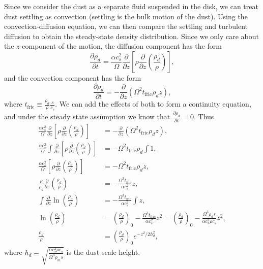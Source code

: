 \documentclass[11pt]{article}
\newenvironment{tight_enumerate}{
    \begin{enumerate}[label=(\alph*)]
    \setlength{\itemsep}{3pt}
    \setlength{\parskip}{0pt}}
    {\end{enumerate}}
\begin{document}
\begin{tight_enumerate}
\item Since we consider the dust as a separate fluid suspended in the disk, we can treat dust settling as convection (settling is the bulk motion of the dust). Using the convection-diffusion equation, we can then compare the settling and turbulent diffusion to obtain the steady-state density distribution. Since we only care about the $z$-component of the motion, the diffusion component has the form 
\[\frac{\partial \rho_d}{\partial t} = \frac{\alpha c_s^2}{\Omega}\frac{\partial}{\partial z}\left[\rho\frac{\partial}{\partial z}\left(\frac{\rho_d}{\rho}\right)\right],\]
and the convection component has the form 
\[\frac{\partial \rho_d}{\partial t} = -\frac{\partial}{\partial z}(\Omega^2 t_\text{fric}\rho_d z),\]
where $t_\text{fric} \equiv \frac{\rho_d}{\rho}\frac{s}{c_s}$. We can add the effects of both to form a continuity equation, and under the steady state assumption we know that $\frac{\partial \rho_d}{\partial t} = 0$. Thus 
\begin{align*}
\frac{\alpha c_s^2}{\Omega}\frac{\partial}{\partial z}\left[\rho\frac{\partial}{\partial z}\left(\frac{\rho_d}{\rho}\right)\right] &= -\frac{\partial}{\partial z}(\Omega^2 t_\text{fric}\rho_d z),\\
\frac{\alpha c_s^2}{\Omega}\int\frac{\partial}{\partial z}\left[\rho\frac{\partial}{\partial z}\left(\frac{\rho_d}{\rho}\right)\right] &= -\Omega^2 t_\text{fric}\rho_d\int1,\\
\frac{\alpha c_s^2}{\Omega}\left[\rho\frac{\partial}{\partial z}\left(\frac{\rho_d}{\rho}\right)\right] &= -\Omega^2 t_\text{fric}\rho_d z,\\
\frac{\rho}{\rho_d}\frac{\partial}{\partial z}\left(\frac{\rho_d}{\rho}\right) &= -\frac{\Omega^3 t_{\text{fric}}}{\alpha c_s^2} z,\\
\int\frac{\partial}{\partial z}\ln\left(\frac{\rho_d}{\rho}\right) &= -\frac{\Omega^3 t_{\text{fric}}}{\alpha c_s^2}\int
z,\\
\ln\left(\frac{\rho_d}{\rho}\right) &= \left(\frac{\rho_d}{\rho}\right)_0 - \frac{\Omega^3 t_{\text{fric}}}{\alpha c_s^2} z^2 = \left(\frac{\rho_d}{\rho}\right)_0 - \frac{\Omega^3 \rho_d s}{\alpha c_s^2 \rho c_s} z^2,\\
\frac{\rho_d}{\rho} &= \left(\frac{\rho_d}{\rho}\right)_0 e^{-z^2/2h_d^2},
\end{align*}
where $h_d \equiv \sqrt{\frac{\alpha c_s^2 \rho c_s}{\Omega^3 \rho_m s}}$ is the dust scale height.\\
\end{tight_enumerate}
\end{document}
